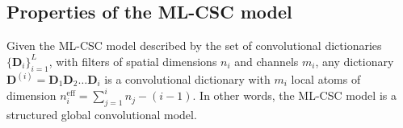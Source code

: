 \documentclass[10pt,journal]{IEEEtran}
\def\D{{\mathbf D}}
\theoremstyle{plain}
\theoremstyle{definition}
\begin{document}
\appendix 

\newtheorem{innercustomgeneric}{\customgenericname}
\providecommand{\customgenericname}{}
\newcommand{\newcustomtheorem}[2]{%
	\newenvironment{#1}[1]
	{%
		\renewcommand\customgenericname{#2}%
		\renewcommand\theinnercustomgeneric{##1}%
		\innercustomgeneric
	}
	{\endinnercustomgeneric}
}

\newcustomtheorem{customlemma}{Lemma}
\newcustomtheorem{customdef}{Definition}

\subsection{Properties of the ML-CSC model}
\label{app:MLCSCisCSC}

\begin{customlemma}{1} \label{lemma:MLCSCisCSC}
	Given the ML-CSC model described by the set of convolutional dictionaries $\{\D_i\}_{i=1}^L$, with filters of spatial dimensions $n_i$ and channels $m_i$, any dictionary $\D^{(i)} = \D_1 \D_2 \dots \D_i$ is a convolutional dictionary with $m_i$ local atoms of dimension $n_i^{\text{eff}} = \sum_{j=1}^{i} n_j - (i-1)$. In other words, the ML-CSC model is a structured global convolutional model.
\end{customlemma}
\end{document}
